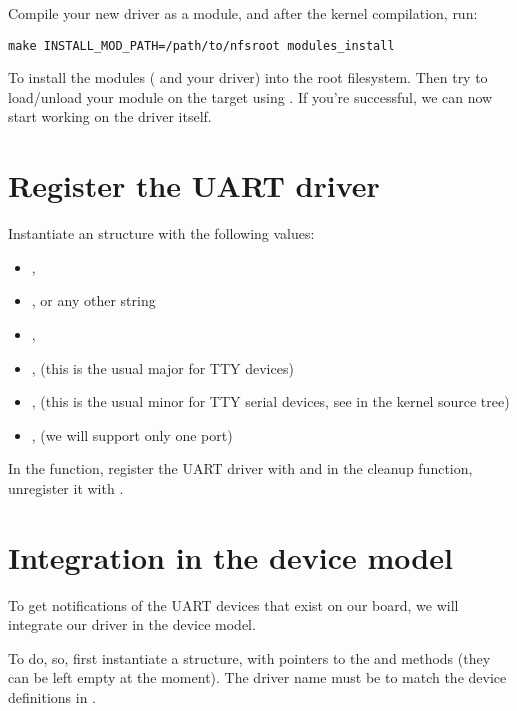 Compile your new driver as a module, and after the kernel compilation, run:

\begin{verbatim}
make INSTALL_MOD_PATH=/path/to/nfsroot modules_install
\end{verbatim}

To install the modules ( and your driver) into the
root filesystem. Then try to load/unload your module on the target
using . If you're successful, we can now start working
on the driver itself.

\section{Register the UART driver}

Instantiate an  structure with the following values:

\begin{itemize}
\item {}, 
\item {},  or any other string
\item {}, 
\item {},  (this is the usual major for TTY devices)
\item {},  (this is the usual minor for TTY serial
  devices, see  in the kernel source tree)
\item {},  (we will support only one port)
\end{itemize}

In the  function, register the UART driver with
 and in the cleanup function,
unregister it with .

\section{Integration in the device model}

To get notifications of the UART devices that exist on our board, we
will integrate our driver in the device model.

To do, so, first instantiate a  structure, with
pointers to the  and  methods (they can
be left empty at the moment). The driver name must be
 to match the device definitions in
.

